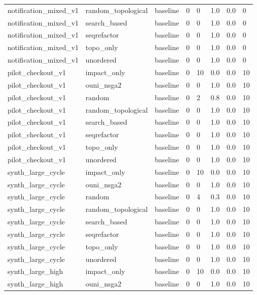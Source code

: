 \begin{table}[t]
\begin{tabular}{llllllll}
notification\_mixed\_v1 & random\_topological & baseline & 0 & 0 & 1.0 & 0.0 & 0 \\
notification\_mixed\_v1 & search\_based & baseline & 0 & 0 & 1.0 & 0.0 & 0 \\
notification\_mixed\_v1 & seqrefactor & baseline & 0 & 0 & 1.0 & 0.0 & 0 \\
notification\_mixed\_v1 & topo\_only & baseline & 0 & 0 & 1.0 & 0.0 & 0 \\
notification\_mixed\_v1 & unordered & baseline & 0 & 0 & 1.0 & 0.0 & 0 \\
pilot\_checkout\_v1 & impact\_only & baseline & 0 & 10 & 0.0 & 0.0 & 10 \\
pilot\_checkout\_v1 & ouni\_nsga2 & baseline & 0 & 0 & 1.0 & 0.0 & 10 \\
pilot\_checkout\_v1 & random & baseline & 0 & 2 & 0.8 & 0.0 & 10 \\
pilot\_checkout\_v1 & random\_topological & baseline & 0 & 0 & 1.0 & 0.0 & 10 \\
pilot\_checkout\_v1 & search\_based & baseline & 0 & 0 & 1.0 & 0.0 & 10 \\
pilot\_checkout\_v1 & seqrefactor & baseline & 0 & 0 & 1.0 & 0.0 & 10 \\
pilot\_checkout\_v1 & topo\_only & baseline & 0 & 0 & 1.0 & 0.0 & 10 \\
pilot\_checkout\_v1 & unordered & baseline & 0 & 0 & 1.0 & 0.0 & 10 \\
synth\_large\_cycle & impact\_only & baseline & 0 & 10 & 0.0 & 0.0 & 10 \\
synth\_large\_cycle & ouni\_nsga2 & baseline & 0 & 0 & 1.0 & 0.0 & 10 \\
synth\_large\_cycle & random & baseline & 0 & 4 & 0.3 & 0.0 & 10 \\
synth\_large\_cycle & random\_topological & baseline & 0 & 0 & 1.0 & 0.0 & 10 \\
synth\_large\_cycle & search\_based & baseline & 0 & 0 & 1.0 & 0.0 & 10 \\
synth\_large\_cycle & seqrefactor & baseline & 0 & 0 & 1.0 & 0.0 & 10 \\
synth\_large\_cycle & topo\_only & baseline & 0 & 0 & 1.0 & 0.0 & 10 \\
synth\_large\_cycle & unordered & baseline & 0 & 0 & 1.0 & 0.0 & 10 \\
synth\_large\_high & impact\_only & baseline & 0 & 10 & 0.0 & 0.0 & 10 \\
synth\_large\_high & ouni\_nsga2 & baseline & 0 & 0 & 1.0 & 0.0 & 10 \\

\end{tabular}
\end{table}
